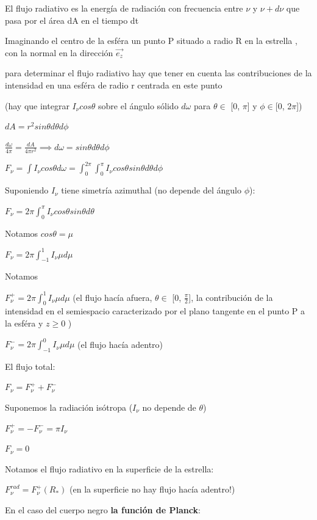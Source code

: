 \documentclass[10pt]{book}
\begin{document}
El flujo radiativo es la energía de radiación  con frecuencia entre $\nu$ y $\nu + d\nu$ que pasa por el área dA en el tiempo dt

Imaginando el centro de la esféra un punto P situado a radio R en la estrella , con la normal en la dirección $\vec{e_z}$

para determinar el flujo radiativo hay que tener en cuenta  las contribuciones de la intensidad en una esféra de radio r centrada en este punto  

(hay que integrar $I_{\nu} cos \theta $ sobre el ángulo sólido $d\omega $ para $\theta \in$ [0, $\pi$] y $\phi \in $[0, 2$\pi$])

$dA = r^2 sin \theta d\theta d\phi $

$\frac{d\omega}{4\pi} = \frac{dA}{4 \pi r^2}  \implies d\omega = sin \theta d\theta d\phi$


$F_{\nu} = \int{I_{\nu}cos \theta d\omega} = \int_0^{2 \pi}{\int_{0}^{\pi}{I_{\nu} cos \theta sin \theta d\theta } d\phi }$

Suponiendo $I_{\nu}$ tiene  simetría azimuthal (no depende del ángulo $\phi$):

$F_{\nu} = 2 \pi \int_0^{\pi}{I_{\nu}cos \theta sin \theta d\theta } $

Notamos $cos \theta = \mu$

$F_{\nu} = 2 \pi \int_{-1}^{1}{I_{\nu} \mu d\mu } $

Notamos 

$F_{\nu}^{+} = 2 \pi \int_{0}^{1}{I_{\nu} \mu d\mu } $  (el flujo hacía afuera, $\theta \in$ [0, $\frac{\pi}{2}$], 
la contribución de la intensidad  en el semiespacio caracterizado por el plano tangente en el punto P a la esféra y $z \ge 0$ ) 

$F_{\nu}^{-} = 2 \pi \int_{-1}^{0}{I_{\nu} \mu d\mu } $  (el flujo hacía adentro)

El flujo total:

$F_{\nu} = F_{\nu}^{+} + F_{\nu}^{-}$

Suponemos la radiación isótropa ($I_{\nu}$ no depende de $\theta$)

$F_{\nu}^{+} = -F_{\nu}^{-} =   \pi I_{\nu} $

$F_{\nu} = 0$ 

Notamos el flujo radiativo  en la superficie de la estrella:

$F_{\nu}^{rad} = F_{\nu}^{+}(R_{*}) $ (en la superficie no hay flujo hacía adentro!)


En el caso del cuerpo negro \textbf{la función de Planck}:
\end{document}
